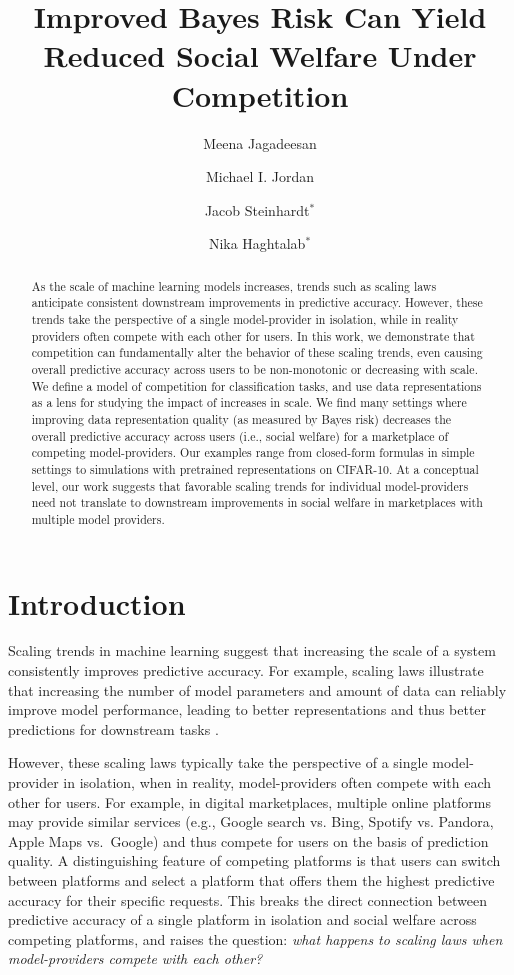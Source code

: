 \documentclass[letterpaper,11pt]{article}
\title{\Large{Improved Bayes Risk Can Yield Reduced Social Welfare Under Competition}}
\author{Meena Jagadeesan}
\author{Michael I. Jordan}
\author{Jacob Steinhardt$^*$}
\author{Nika Haghtalab$^*$}
\affil{University of California, Berkeley}
\date{}%
\theoremstyle{plain}
\begin{document}
\maketitle

\begin{abstract}
As the scale of machine learning models increases, trends such as scaling laws anticipate consistent downstream improvements in predictive accuracy. However, these trends take the perspective of a single model-provider in isolation, while in reality providers often compete with each other for users. In this work, we demonstrate that competition can fundamentally alter the behavior of these scaling trends, even causing overall predictive accuracy across users to be non-monotonic or decreasing with scale. We define a model of competition for classification tasks, and use data representations as a lens for studying the impact of increases in scale. We find many settings where improving data representation quality (as measured by Bayes risk) decreases the overall predictive accuracy across users (i.e., social welfare) for a marketplace of competing model-providers. Our examples range from closed-form formulas in simple settings to simulations with pretrained representations on CIFAR-10. 
At a conceptual level, our work suggests that favorable scaling trends for individual model-providers need not translate to downstream improvements in  social welfare in marketplaces with  multiple model providers. 
\end{abstract}

\section{Introduction}

Scaling trends in machine learning suggest that increasing the scale of a system consistently improves predictive accuracy. For example, scaling laws illustrate that increasing the number of model parameters  \citep{K20, SK20, B21} and amount of data \citep{H22} can reliably improve model performance, leading to better representations and thus better predictions for downstream tasks \citep{hernandez2021scaling}. 


\def\thefootnote{*}\def\thefootnote{\arabic{footnote}}

However, these scaling laws typically take the perspective of a single model-provider in isolation, when in reality, model-providers often compete with each other for users. For example, in digital marketplaces, multiple online platforms  may provide similar services (e.g., Google search vs. Bing, Spotify vs. Pandora, Apple Maps vs.\ Google) and thus compete for users  on the basis of prediction quality. A distinguishing feature of competing platforms is that users can switch between platforms and select a platform that offers them the highest predictive accuracy for their specific requests. This breaks the direct connection between predictive accuracy of a single platform in isolation and social welfare across competing platforms, and raises the question: \textit{what happens to scaling laws when model-providers compete with each other?}
\end{document}
